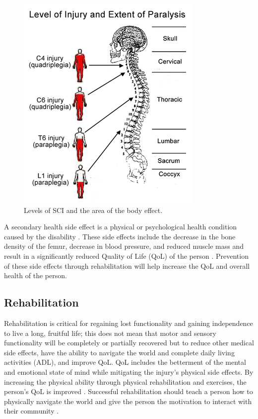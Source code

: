  

\begin{figure}
    \centering
    \includegraphics[scale=0.6]{images/background/SCI.png}
    \caption[Levels of SCI]{Levels of SCI and the area of the body effect. \cite{sadaka2012bradycardia}}
    \label{fig:SCILevels}
\end{figure}

A secondary health side effect is a physical or psychological health condition caused by the disability \cite{jensen2012secondary}. These side effects include the decrease in the bone density of the femur, decrease in blood pressure, and reduced muscle mass \cite{haisma2007complications} \cite{hitzig2010understanding} and result in a significantly reduced Quality of Life (QoL) of the person	\cite{craven2012impact}. Prevention of these side effects through rehabilitation will help increase the QoL and overall health of the person.  








\subsection{Rehabilitation}
\label{sec:rehab}

 Rehabilitation is critical for regaining lost functionality and gaining independence to live a long, fruitful life; this does not mean that motor and sensory functionality will be completely or partially recovered but to reduce other medical side effects, have the ability to navigate the world and complete daily living activities (ADL), and improve QoL. QoL includes the betterment of the mental and emotional state of mind while mitigating the injury's physical side effects. By increasing the physical ability through physical rehabilitation and exercises, the person's QoL is improved \cite{noreau1995spinal}. Successful rehabilitation should teach a person how to physically navigate the world and give the person the motivation to interact with their community \cite{hammell2013spinal}.
 
